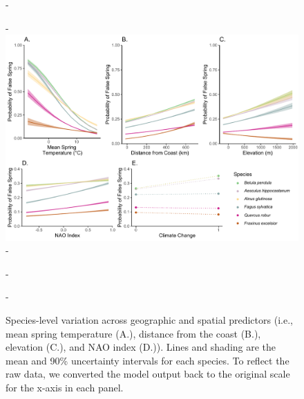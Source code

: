\documentclass{article}\usepackage[]{graphicx}\usepackage[]{color}
\begin{document}
{\begin{figure} [H]
  -\begin{center}
  -\includegraphics[width=16cm]{..//analyses/figures/InteractionPlots/Species_orig.pdf}
  -\caption{Species-level variation across geographic and spatial predictors (i.e., mean spring temperature (A.), distance from the coast (B.), elevation (C.), and NAO index (D.)). Lines and shading are the mean and 90\% uncertainty intervals for each species. To reflect the raw data, we converted the model output back to the original scale for the x-axis in each panel. }\label{fig:spp}
  -\end{center}
  -\end{figure}}


  
\end{document}
